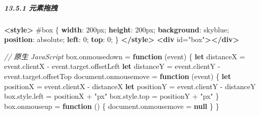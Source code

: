 \documentclass[
]{article}
\newenvironment{Shaded}{}{}
\newcommand{\AttributeTok}[1]{\textcolor[rgb]{0.49,0.56,0.16}{#1}}
\newcommand{\BuiltInTok}[1]{#1}
\newcommand{\CommentTok}[1]{\textcolor[rgb]{0.38,0.63,0.69}{\textit{#1}}}
\newcommand{\ConstantTok}[1]{\textcolor[rgb]{0.53,0.00,0.00}{#1}}
\newcommand{\DataTypeTok}[1]{\textcolor[rgb]{0.56,0.13,0.00}{#1}}
\newcommand{\DecValTok}[1]{\textcolor[rgb]{0.25,0.63,0.44}{#1}}
\newcommand{\KeywordTok}[1]{\textcolor[rgb]{0.00,0.44,0.13}{\textbf{#1}}}
\newcommand{\NormalTok}[1]{#1}
\newcommand{\OperatorTok}[1]{\textcolor[rgb]{0.40,0.40,0.40}{#1}}
\newcommand{\OtherTok}[1]{\textcolor[rgb]{0.00,0.44,0.13}{#1}}
\newcommand{\PreprocessorTok}[1]{\textcolor[rgb]{0.74,0.48,0.00}{#1}}
\newcommand{\StringTok}[1]{\textcolor[rgb]{0.25,0.44,0.63}{#1}}
\begin{document}
\hypertarget{1351-ux5143ux7d20ux62d6ux62fd}{%
\subparagraph{13.5.1 元素拖拽}\label{1351-ux5143ux7d20ux62d6ux62fd}}

\begin{Shaded}
\begin{Highlighting}[]
\KeywordTok{\textless{}style\textgreater{}}
  \PreprocessorTok{\#box}\NormalTok{ \{}
    \KeywordTok{width}\NormalTok{: }\DecValTok{200}\DataTypeTok{px}\OperatorTok{;}
    \KeywordTok{height}\NormalTok{: }\DecValTok{200}\DataTypeTok{px}\OperatorTok{;}
    \KeywordTok{background}\NormalTok{: }\ConstantTok{skyblue}\OperatorTok{;}
    \KeywordTok{position}\NormalTok{: }\DecValTok{absolute}\OperatorTok{;}
    \KeywordTok{left}\NormalTok{: }\DecValTok{0}\OperatorTok{;}
    \KeywordTok{top}\NormalTok{: }\DecValTok{0}\OperatorTok{;}
\NormalTok{  \}}
\KeywordTok{\textless{}/style\textgreater{}}
\KeywordTok{\textless{}div}\OtherTok{ id=}\StringTok{"box"}\KeywordTok{\textgreater{}\textless{}/div\textgreater{}}
\end{Highlighting}
\end{Shaded}

\begin{Shaded}
\begin{Highlighting}[]
\CommentTok{// 原生 JavaScript}
\NormalTok{box}\OperatorTok{.}\AttributeTok{onmousedown} \OperatorTok{=} \KeywordTok{function}\NormalTok{ (}\BuiltInTok{event}\NormalTok{) \{}
  \KeywordTok{let}\NormalTok{ distanceX }\OperatorTok{=} \BuiltInTok{event}\OperatorTok{.}\AttributeTok{clientX} \OperatorTok{{-}} \BuiltInTok{event}\OperatorTok{.}\AttributeTok{target}\OperatorTok{.}\AttributeTok{offsetLeft}
  \KeywordTok{let}\NormalTok{ distanceY }\OperatorTok{=} \BuiltInTok{event}\OperatorTok{.}\AttributeTok{clientY} \OperatorTok{{-}} \BuiltInTok{event}\OperatorTok{.}\AttributeTok{target}\OperatorTok{.}\AttributeTok{offsetTop}
  \BuiltInTok{document}\OperatorTok{.}\AttributeTok{onmousemove} \OperatorTok{=} \KeywordTok{function}\NormalTok{ (}\BuiltInTok{event}\NormalTok{) \{}
    \KeywordTok{let}\NormalTok{ positionX }\OperatorTok{=} \BuiltInTok{event}\OperatorTok{.}\AttributeTok{clientX} \OperatorTok{{-}}\NormalTok{ distanceX}
    \KeywordTok{let}\NormalTok{ positionY }\OperatorTok{=} \BuiltInTok{event}\OperatorTok{.}\AttributeTok{clientY} \OperatorTok{{-}}\NormalTok{ distanceY}
\NormalTok{    box}\OperatorTok{.}\AttributeTok{style}\OperatorTok{.}\AttributeTok{left} \OperatorTok{=}\NormalTok{ positionX }\OperatorTok{+} \StringTok{"px"}
\NormalTok{    box}\OperatorTok{.}\AttributeTok{style}\OperatorTok{.}\AttributeTok{top} \OperatorTok{=}\NormalTok{ positionY }\OperatorTok{+} \StringTok{"px"}
\NormalTok{  \}}
\NormalTok{  box}\OperatorTok{.}\AttributeTok{onmouseup} \OperatorTok{=} \KeywordTok{function}\NormalTok{ () \{}
    \BuiltInTok{document}\OperatorTok{.}\AttributeTok{onmousemove} \OperatorTok{=} \KeywordTok{null}
\NormalTok{  \}}
\NormalTok{\}}
\end{Highlighting}
\end{Shaded}
\end{document}
